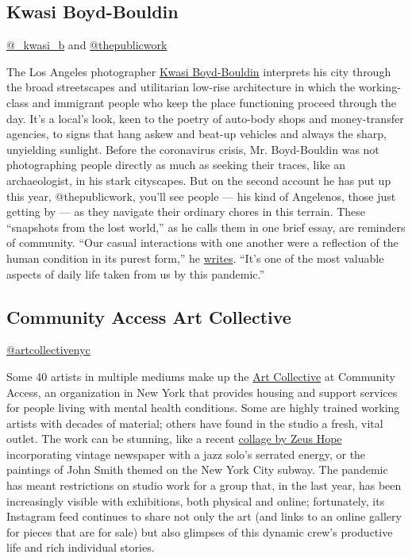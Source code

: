 \hypertarget{kwasi-boyd-bouldin}{%
\subsection{Kwasi Boyd-Bouldin}\label{kwasi-boyd-bouldin}}

\href{https://www.instagram.com/_kwasi_b/}{@\_kwasi\_b} and
\href{https://www.instagram.com/thepublicwork/}{@thepublicwork}

\begin{quote}
\end{quote}

The Los Angeles photographer
\href{http://www.kwasiboydbouldin.com/}{Kwasi Boyd-Bouldin} interprets
his city through the broad streetscapes and utilitarian low-rise
architecture in which the working-class and immigrant people who keep
the place functioning proceed through the day. It's a local's look, keen
to the poetry of auto-body shops and money-transfer agencies, to signs
that hang askew and beat-up vehicles and always the sharp, unyielding
sunlight. Before the coronavirus crisis, Mr. Boyd-Bouldin was not
photographing people directly as much as seeking their traces, like an
archaeologist, in his stark cityscapes. But on the second account he has
put up this year, @thepublicwork, you'll see people --- his kind of
Angelenos, those just getting by --- as they navigate their ordinary
chores in this terrain. These ``snapshots from the lost world,'' as he
calls them in one brief essay, are reminders of community. ``Our casual
interactions with one another were a reflection of the human condition
in its purest form,'' he
\href{http://thepublicwork.com/2020/07/recent-nostalgia/}{writes}.
``It's one of the most valuable aspects of daily life taken from us by
this pandemic.''

\hypertarget{community-access-art-collective}{%
\subsection{Community Access Art
Collective}\label{community-access-art-collective}}

\href{https://www.instagram.com/artcollectivenyc/}{@artcollectivenyc}

Some 40 artists in multiple mediums make up the
\href{https://communityaccessart.org/}{Art Collective} at Community
Access, an organization in New York that provides housing and support
services for people living with mental health conditions. Some are
highly trained working artists with decades of material; others have
found in the studio a fresh, vital outlet. The work can be stunning,
like a recent \href{https://www.instagram.com/p/CCZJVdJFdM1/}{collage by
Zeus Hope} incorporating vintage newspaper with a jazz solo's serrated
energy, or the paintings of John Smith themed on the New York City
subway. The pandemic has meant restrictions on studio work for a group
that, in the last year, has been increasingly visible with exhibitions,
both physical and online; fortunately, its Instagram feed continues to
share not only the art (and links to an online gallery for pieces that
are for sale) but also glimpses of this dynamic crew's productive life
and rich individual stories.

